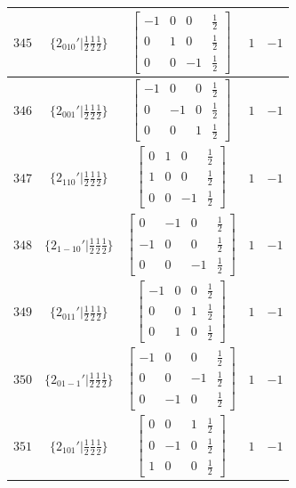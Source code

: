 \documentclass[fleqn,8pt]{jsarticle}
\begin{document}
\begin{longtable}{ccccc}
$ 345 $ & $ \{2{}_{010}{}'|\frac{1}{2} \frac{1}{2} \frac{1}{2}\} $ & $ \begin{bmatrix} -1 & 0 & 0 & \frac{1}{2} \\ 0 & 1 & 0 & \frac{1}{2} \\ 0 & 0 & -1 & \frac{1}{2} \end{bmatrix} $ & $ 1 $ & $ -1 $ \\ \hline
$ 346 $ & $ \{2{}_{001}{}'|\frac{1}{2} \frac{1}{2} \frac{1}{2}\} $ & $ \begin{bmatrix} -1 & 0 & 0 & \frac{1}{2} \\ 0 & -1 & 0 & \frac{1}{2} \\ 0 & 0 & 1 & \frac{1}{2} \end{bmatrix} $ & $ 1 $ & $ -1 $ \\ \hline
$ 347 $ & $ \{2{}_{110}{}'|\frac{1}{2} \frac{1}{2} \frac{1}{2}\} $ & $ \begin{bmatrix} 0 & 1 & 0 & \frac{1}{2} \\ 1 & 0 & 0 & \frac{1}{2} \\ 0 & 0 & -1 & \frac{1}{2} \end{bmatrix} $ & $ 1 $ & $ -1 $ \\ \hline
$ 348 $ & $ \{2{}_{1-10}{}'|\frac{1}{2} \frac{1}{2} \frac{1}{2}\} $ & $ \begin{bmatrix} 0 & -1 & 0 & \frac{1}{2} \\ -1 & 0 & 0 & \frac{1}{2} \\ 0 & 0 & -1 & \frac{1}{2} \end{bmatrix} $ & $ 1 $ & $ -1 $ \\ \hline
$ 349 $ & $ \{2{}_{011}{}'|\frac{1}{2} \frac{1}{2} \frac{1}{2}\} $ & $ \begin{bmatrix} -1 & 0 & 0 & \frac{1}{2} \\ 0 & 0 & 1 & \frac{1}{2} \\ 0 & 1 & 0 & \frac{1}{2} \end{bmatrix} $ & $ 1 $ & $ -1 $ \\ \hline
$ 350 $ & $ \{2{}_{01-1}{}'|\frac{1}{2} \frac{1}{2} \frac{1}{2}\} $ & $ \begin{bmatrix} -1 & 0 & 0 & \frac{1}{2} \\ 0 & 0 & -1 & \frac{1}{2} \\ 0 & -1 & 0 & \frac{1}{2} \end{bmatrix} $ & $ 1 $ & $ -1 $ \\ \hline
$ 351 $ & $ \{2{}_{101}{}'|\frac{1}{2} \frac{1}{2} \frac{1}{2}\} $ & $ \begin{bmatrix} 0 & 0 & 1 & \frac{1}{2} \\ 0 & -1 & 0 & \frac{1}{2} \\ 1 & 0 & 0 & \frac{1}{2} \end{bmatrix} $ & $ 1 $ & $ -1 $ \\ \hline

\end{longtable}
\end{document}
